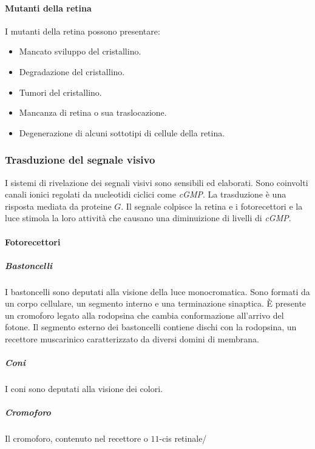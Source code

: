 			\paragraph{Mutanti della retina}
			I mutanti della retina possono presentare:
			\begin{multicols}{2}
				\begin{itemize}
					\item Mancato sviluppo del cristallino.
					\item Degradazione del cristallino.
					\item Tumori del cristallino.
					\item Mancanza di retina o sua traslocazione.
					\item Degenerazione di alcuni sottotipi di cellule della retina.
				\end{itemize}
			\end{multicols}

		\subsubsection{Trasduzione del segnale visivo}
		I sistemi di rivelazione dei segnali visivi sono sensibili ed elaborati.
		Sono coinvolti canali ionici regolati da nucleotidi ciclici come \emph{cGMP}.
		La trasduzione \`e una risposta mediata da proteine $G$.
		Il segnale colpisce la retina e i fotorecettori e la luce stimola la loro attivit\`a che causano una diminuizione di livelli di \emph{cGMP}.

			\paragraph{Fotorecettori}

				\subparagraph{Bastoncelli}
				I bastoncelli sono deputati alla visione della luce monocromatica.
				Sono formati da un corpo cellulare, un segmento interno e una terminazione sinaptica.
				\`E presente un cromoforo legato alla rodopsina che cambia conformazione all'arrivo del fotone.
				Il segmento esterno dei bastoncelli contiene dischi con la rodopsina, un recettore muscarinico caratterizzato da diversi domini di membrana.

				\subparagraph{Coni}
				I coni sono deputati alla visione dei colori.

				\subparagraph{Cromoforo}
				Il cromoforo, contenuto nel recettore o $11$-cis retinale/

